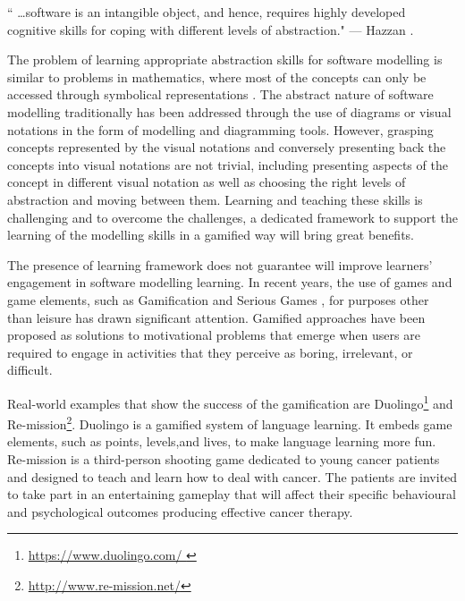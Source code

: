\documentclass[12pt, a4paper]{report} \usepackage[titletoc]{appendix}
\begin{document}
\begin{displayquote}
`` \dots software is an intangible object, and hence, requires highly developed
cognitive skills for coping with different levels of abstraction." --- Hazzan
\cite{hazzan2008reflections}.
\end{displayquote}

The problem of learning appropriate abstraction skills for software modelling is similar to problems in mathematics, where most of the concepts can only be accessed through symbolical representations \cite{Duval2006}. The abstract nature of software modelling traditionally has been addressed through the use of diagrams or visual notations in the form of modelling and diagramming tools. However, grasping concepts represented by the visual notations and conversely presenting back the concepts into visual notations are not trivial, including presenting aspects of the concept in different visual notation as well as choosing the right levels of abstraction and moving between them. Learning and teaching these skills is challenging and to overcome the challenges, a dedicated framework to support the learning of the modelling skills in a gamified way will bring great benefits. 
 
The presence of learning framework does not guarantee will improve learners' engagement in software modelling learning. In recent years, the use of games and game elements, such as Gamification \cite{deterding2011game} and Serious Games \cite{Michael2005}, for purposes other than leisure has drawn significant attention. Gamified approaches have been proposed as solutions to motivational problems that emerge when users are required to engage in activities that they perceive as boring, irrelevant, or difficult. 

Real-world examples that show the success of the gamification are Duolingo\footnote{\url{https://www.duolingo.com/ }} and Re-mission\footnote{\url{http://www.re-mission.net/}}. Duolingo is a gamified system of language learning. It embeds game elements, such as points, levels,and lives, to make language learning more fun. Re-mission is a third-person shooting game dedicated to young cancer patients and designed to teach and learn how to deal with cancer. The patients are invited to take part in an entertaining gameplay that will affect their specific behavioural and psychological outcomes producing effective cancer therapy.
 
\end{document}
